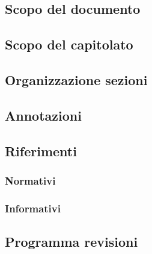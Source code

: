 \subsection{Scopo del documento}
\subsection{Scopo del capitolato}
\subsection{Organizzazione sezioni}
\subsection{Annotazioni}
\subsection{Riferimenti}
\subsubsection{Normativi}
\subsubsection{Informativi}
\subsection{Programma revisioni}